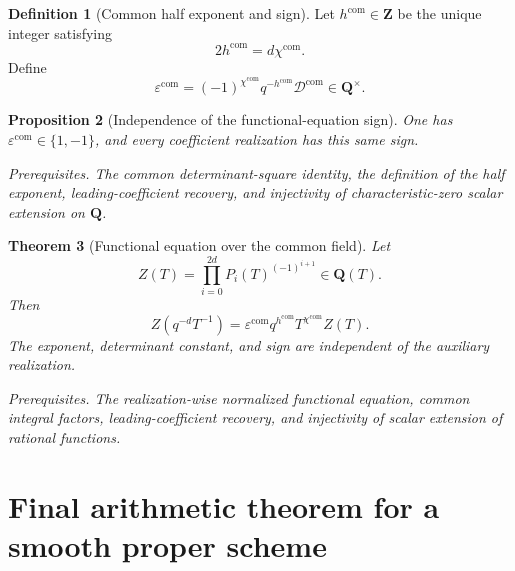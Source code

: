\documentclass[10pt]{article}
\newtheorem{theorem}{Theorem}[section]
\newtheorem{proposition}[theorem]{Proposition}
\theoremstyle{definition}
\newtheorem{definition}[theorem]{Definition}
\newcommand{\deps}[1]{\par\smallskip\noindent\textit{Prerequisites.} #1}
\begin{document}
\begin{definition}[Common half exponent and sign]
Let \(h^{\mathrm{com}}\in\mathbf Z\) be the unique integer satisfying
\[
 2h^{\mathrm{com}}=d\chi^{\mathrm{com}}.
\]
Define
\[
 \varepsilon^{\mathrm{com}}
 =(-1)^{\chi^{\mathrm{com}}}q^{-h^{\mathrm{com}}}
  \mathcal D^{\mathrm{com}}\in\mathbf Q^\times.
\]
\end{definition}

\begin{proposition}[Independence of the functional-equation sign]
One has \(\varepsilon^{\mathrm{com}}\in\{1,-1\}\), and every coefficient
realization has this same sign.
\deps{The common determinant-square identity, the definition of the half
exponent, leading-coefficient recovery, and injectivity of
characteristic-zero scalar extension on \(\mathbf Q\).}
\end{proposition}

\begin{theorem}[Functional equation over the common field]
Let
\[
 Z(T)=\prod_{i=0}^{2d}P_i(T)^{(-1)^{i+1}}
 \in\mathbf Q(T).
\]
Then
\[
 \boxed{
 Z(q^{-d}T^{-1})
 =\varepsilon^{\mathrm{com}}
   q^{h^{\mathrm{com}}}
   T^{\chi^{\mathrm{com}}}Z(T).}
\]
The exponent, determinant constant, and sign are independent of the
auxiliary realization.
\deps{The realization-wise normalized functional equation, common integral
factors, leading-coefficient recovery, and injectivity of scalar extension
of rational functions.}
\end{theorem}

\section{Final arithmetic theorem for a smooth proper scheme}
\end{document}
